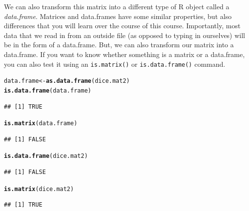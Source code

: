 \documentclass[12pt]{article}\usepackage[]{graphicx}\usepackage[]{color}
\makeatletter
\newcommand{\hlstd}[1]{\textcolor[rgb]{0.345,0.345,0.345}{#1}}%
\newcommand{\hlkwb}[1]{\textcolor[rgb]{0.69,0.353,0.396}{#1}}%
\newcommand{\hlkwd}[1]{\textcolor[rgb]{0.737,0.353,0.396}{\textbf{#1}}}%
\newenvironment{kframe}{%
 \def\at@end@of@kframe{}%
 \ifinner\ifhmode%
  \def\at@end@of@kframe{\end{minipage}}%
  \begin{minipage}{\columnwidth}%
 \fi\fi%
 \def\FrameCommand##1{\hskip\@totalleftmargin \hskip-\fboxsep
 \colorbox{shadecolor}{##1}\hskip-\fboxsep
     \hskip-\linewidth \hskip-\@totalleftmargin \hskip\columnwidth}%
 \MakeFramed {\advance\hsize-\width
   \@totalleftmargin\z@ \linewidth\hsize
   \@setminipage}}%
 {\par\unskip\endMakeFramed%
 \at@end@of@kframe}
\newenvironment{knitrout}{}{} %
\makeatother
\begin{document}
We can also transform this matrix into a different type of R object called a \emph{data.frame}. Matrices and data.frames have some similar properties, but also differences that you will learn over the course of this course. Importantly, most data that we read in from an outside file (as opposed to typing in ourselves) will be in the form of a data.frame. But, we can also transform our matrix into a data.frame. If you want to know whether something is a matrix or a data.frame, you can also test it using an \texttt{is.matrix()} or \texttt{is.data.frame()} command.
\begin{knitrout}
\color{fgcolor}\begin{kframe}
\begin{alltt}
\hlstd{data.frame} \hlkwb{<-} \hlkwd{as.data.frame}\hlstd{(dice.mat2)}
\hlkwd{is.data.frame}\hlstd{(data.frame)}
\end{alltt}
\begin{verbatim}
## [1] TRUE
\end{verbatim}
\begin{alltt}
\hlkwd{is.matrix}\hlstd{(data.frame)}
\end{alltt}
\begin{verbatim}
## [1] FALSE
\end{verbatim}
\begin{alltt}
\hlkwd{is.data.frame}\hlstd{(dice.mat2)}
\end{alltt}
\begin{verbatim}
## [1] FALSE
\end{verbatim}
\begin{alltt}
\hlkwd{is.matrix}\hlstd{(dice.mat2)}
\end{alltt}
\begin{verbatim}
## [1] TRUE
\end{verbatim}
\end{kframe}
\end{knitrout}
\end{document}
